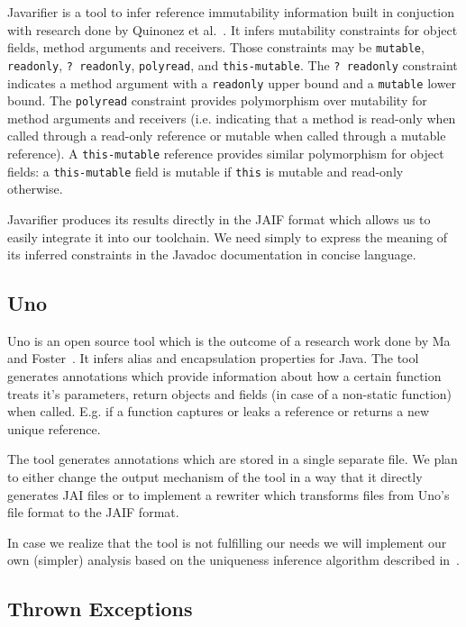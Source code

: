 Javarifier is a tool to infer reference immutability information built in
conjuction with research done by Quinonez et al.~\cite{Javarifier}. It infers
mutability constraints for object fields, method arguments and receivers. Those
constraints may be \texttt{mutable}, \texttt{readonly}, \texttt{?~readonly},
\texttt{polyread}, and \texttt{this-mutable}. The \texttt{?~readonly}
constraint indicates a method argument with a \texttt{readonly} upper bound and
a \texttt{mutable} lower bound. The \texttt{polyread} constraint provides
polymorphism over mutability for method arguments and receivers
(i.e. indicating that a method is read-only when called through a read-only
reference or mutable when called through a mutable reference). A
\texttt{this-mutable} reference provides similar polymorphism for object
fields: a \texttt{this-mutable} field is mutable if \texttt{this} is mutable
and read-only otherwise.

Javarifier produces its results directly in the JAIF format which allows us to
easily integrate it into our toolchain. We need simply to express the meaning
of its inferred constraints in the Javadoc documentation in concise language.

\subsection{Uno}

Uno is an open source tool which is the outcome of a research work done by
Ma and Foster~\cite{Uno}. It infers alias and encapsulation properties for Java.
The tool generates annotations which provide information about how a certain function
treats it's parameters, return objects and fields (in case of a non-static function) 
when called. E.g. if a function captures or leaks a reference or returns a new 
unique reference.

The tool generates annotations which are stored in a single separate file. We plan
to either change the output mechanism of the tool in a way that it directly generates
JAI files or to implement a rewriter which transforms files from Uno's file 
format to the JAIF format.

In case we realize that the tool is not fulfilling our needs we will implement
our own (simpler) analysis based on the uniqueness inference algorithm
described in~\cite{UniquenessInference}.

\subsection{Thrown Exceptions}

